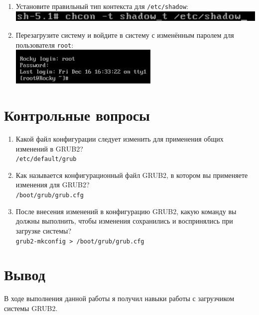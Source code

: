 \documentclass[12pt]{article}
\begin{document}
\begin{enumerate}
	\item Установите правильный тип контекста для \texttt{/etc/shadow}:
	      \\\includegraphics{14.png}
	\item Перезагрузите систему и войдите в систему с изменённым паролем для пользователя \texttt{root}:
	      \\\includegraphics{15.png}
\end{enumerate}

\section{Контрольные вопросы}
\begin{enumerate}
	\item Какой файл конфигурации следует изменить для применения общих изменений в GRUB2? \\
	      \texttt{/etc/default/grub}
	\item Как называется конфигурационный файл GRUB2, в котором вы применяете изменения для GRUB2? \\
	      \texttt{/boot/grub/grub.cfg}
	\item После внесения изменений в конфигурацию GRUB2, какую команду вы должны выполнить, чтобы изменения сохранились и воспринялись при загрузке системы? \\
	      \texttt{grub2-mkconfig > /boot/grub/grub.cfg}
\end{enumerate}

\section{Вывод}
В ходе выполнения данной работы я получил навыки работы с загрузчиком системы GRUB2.
\end{document}
